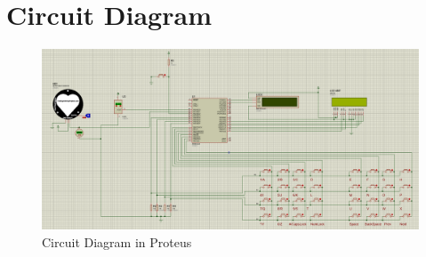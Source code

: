 \documentclass[a4paper,12pt]{article}
\begin{document}
	\section{Circuit Diagram}
	\begin{figure}[H]
		\centering
		\includegraphics[scale=0.45, angle=90]{imgs/circuit_proteus_2.png}
		\caption{Circuit Diagram in Proteus}
	\end{figure}
	\pagebreak
\end{document}
